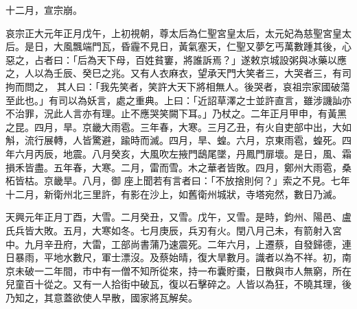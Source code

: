 \begin{pinyinscope}
 十二月，宣宗崩。



 哀宗正大元年正月戊午，上初視朝，尊太后為仁聖宮皇太后，太元妃為慈聖宮皇太后。是日，大風飄端門瓦，昏霾不見日，黃氣塞天，仁聖又夢乞丐萬數踵其後，心惡之，占者曰：「后為天下母，百姓貧窶，將誰訴焉？」遂敕京城設粥與冰藥以應之，人以為壬辰、癸巳之兆。又有人衣麻衣，望承天門大笑者三，大哭者三，有司拘而問之，
 其人曰：「我先笑者，笑許大天下將相無人。後哭者，哀祖宗家國破蕩至此也。」有司以為妖言，處之重典。上曰：「近詔草澤之士並許直言，雖涉譏訕亦不治罪，況此人言亦有理。止不應哭笑闕下耳。」乃杖之。二年正月甲申，有黃黑之昆。四月，旱。京畿大雨雹。三年春，大寒。三月乙丑，有火自吏部中出，大如斛，流行展轉，人皆驚避，踰時而滅。四月，旱、蝗。六月，京東雨雹，蝗死。四年六月丙辰，地震。八月癸亥，大風吹左掖門鴟尾墜，丹鳳門扉壞。是日，風、霜損禾皆盡。五年春，大寒。二月，雷而雪。木之華者皆敗。四月，鄭州大雨雹，桑柘皆枯。京畿旱。八月，御
 座上聞若有言者曰：「不放捨則何？」索之不見。七年十二月，新衛州北三里許，有影在沙上，如舊衛州城狀，寺塔宛然，數日乃滅。



 天興元年正月丁酉，大雪。二月癸丑，又雪。戊午，又雪。是時，鈞州、陽邑、盧氏兵皆大敗。五月，大寒如冬。七月庚辰，兵刃有火。閏八月己未，有箭射入宮中。九月辛丑府，大雷，工部尚書蒲乃速震死。二年六月，上遷蔡，自發歸德，連日暴雨，平地水數尺，軍士漂沒。及蔡始晴，復大旱數月。識者以為不祥。初，南京未破一二年間，市中有一僧不知所從來，持一布囊貯棗，日散與市人無窮，所在
 兒童百十從之。又有一人拾街中破瓦，復以石擊碎之。人皆以為狂，不曉其理，後乃知之，其意蓋欲使人早散，國家將瓦解矣。



\end{pinyinscope}